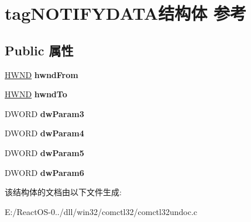 \hypertarget{structtag_n_o_t_i_f_y_d_a_t_a}{}\section{tag\+N\+O\+T\+I\+F\+Y\+D\+A\+T\+A结构体 参考}
\label{structtag_n_o_t_i_f_y_d_a_t_a}
\subsection*{Public 属性}
\begin{DoxyCompactItemize}
\item 
\mbox{\label{structtag_n_o_t_i_f_y_d_a_t_a_a54e438c2ea112623994d43d2fc541807}} 
\hyperlink{interfacevoid}{H\+W\+ND} {\bfseries hwnd\+From}
\item 
\mbox{\label{structtag_n_o_t_i_f_y_d_a_t_a_a706670cacf11086ba9795f36cd646719}} 
\hyperlink{interfacevoid}{H\+W\+ND} {\bfseries hwnd\+To}
\item 
\mbox{\label{structtag_n_o_t_i_f_y_d_a_t_a_af9067b7a83540d758eb8e6a9d01e16a9}} 
D\+W\+O\+RD {\bfseries dw\+Param3}
\item 
\mbox{\label{structtag_n_o_t_i_f_y_d_a_t_a_aa356fff92f3172ec1d0b05131adea1ec}} 
D\+W\+O\+RD {\bfseries dw\+Param4}
\item 
\mbox{\label{structtag_n_o_t_i_f_y_d_a_t_a_a80dcb29935d6f7174392dabd76cf17ae}} 
D\+W\+O\+RD {\bfseries dw\+Param5}
\item 
\mbox{\label{structtag_n_o_t_i_f_y_d_a_t_a_a402833d64285d32157c0be2275a61b8a}} 
D\+W\+O\+RD {\bfseries dw\+Param6}
\end{DoxyCompactItemize}


该结构体的文档由以下文件生成\+:\begin{DoxyCompactItemize}
\item 
E\+:/\+React\+O\+S-\/0../dll/win32/comctl32/comctl32undoc.\+c\end{DoxyCompactItemize}
